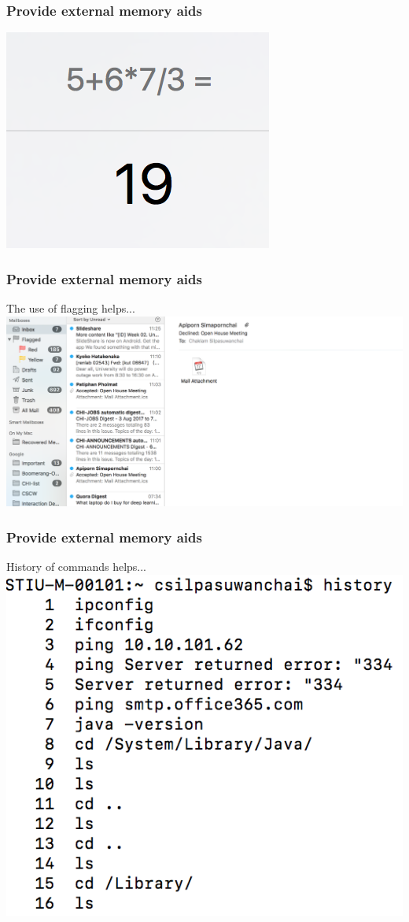 \documentclass{beamer}
\begin{document}
\begin{frame}
	\frametitle{Provide external memory aids}
	\centering
	\includegraphics[width=0.6\linewidth]{image/memory2}
\end{frame}

\begin{frame}
	\frametitle{Provide external memory aids}
	The use of flagging helps...
	\centering
	\includegraphics[width=1\linewidth]{image/memory3}
\end{frame}

\begin{frame}
	\frametitle{Provide external memory aids}
	History of commands helps...
	\centering
	\includegraphics[width=0.5\linewidth]{image/memory4}
\end{frame}
\end{document}

